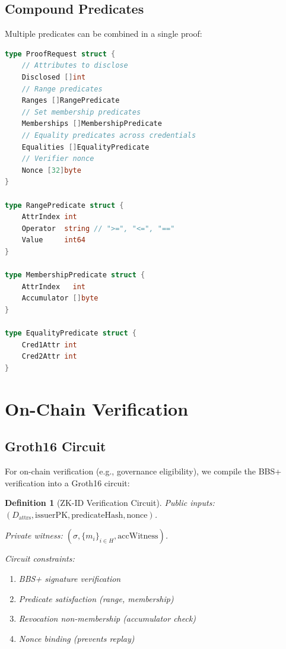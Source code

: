 \documentclass[11pt,a4paper]{article}
\newtheorem{definition}{Definition}[section]
\begin{document}
\subsection{Compound Predicates}

Multiple predicates can be combined in a single proof:

\begin{lstlisting}[language=Go,caption={Compound Predicate Specification}]
type ProofRequest struct {
    // Attributes to disclose
    Disclosed []int
    // Range predicates
    Ranges []RangePredicate
    // Set membership predicates
    Memberships []MembershipPredicate
    // Equality predicates across credentials
    Equalities []EqualityPredicate
    // Verifier nonce
    Nonce [32]byte
}

type RangePredicate struct {
    AttrIndex int
    Operator  string // ">=", "<=", "=="
    Value     int64
}

type MembershipPredicate struct {
    AttrIndex   int
    Accumulator []byte
}

type EqualityPredicate struct {
    Cred1Attr int
    Cred2Attr int
}
\end{lstlisting}

\section{On-Chain Verification}
\label{sec:onchain}

\subsection{Groth16 Circuit}

For on-chain verification (e.g., governance eligibility), we compile the
BBS+ verification into a Groth16 circuit:

\begin{definition}[ZK-ID Verification Circuit]
    Public inputs: $(D_{\mathrm{attrs}}, \mathrm{issuerPK},
    \mathrm{predicateHash}, \mathrm{nonce})$.

    Private witness: $(\sigma, \{m_i\}_{i \in H},
    \mathrm{accWitness})$.

    Circuit constraints:
    \begin{enumerate}
        \item BBS+ signature verification
        \item Predicate satisfaction (range, membership)
        \item Revocation non-membership (accumulator check)
        \item Nonce binding (prevents replay)
    \end{enumerate}
\end{definition}
\end{document}
